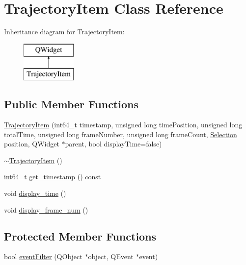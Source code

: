 \hypertarget{classTrajectoryItem}{}\section{Trajectory\+Item Class Reference}
\label{classTrajectoryItem}
Inheritance diagram for Trajectory\+Item\+:\begin{figure}[H]
\begin{center}
\leavevmode
\includegraphics[height=2.000000cm]{classTrajectoryItem}
\end{center}
\end{figure}
\subsection*{Public Member Functions}
\begin{DoxyCompactItemize}
\item 
\hyperlink{classTrajectoryItem_aec384c56b69d666cf6f02b7c4d3fc63a}{Trajectory\+Item} (int64\+\_\+t timestamp, unsigned long time\+Position, unsigned long total\+Time, unsigned long frame\+Number, unsigned long frame\+Count, \hyperlink{structSelection}{Selection} position, Q\+Widget $\ast$parent, bool display\+Time=false)
\item 
\hyperlink{classTrajectoryItem_a8affd9424072ada1f3058e5021c3b54f}{$\sim$\+Trajectory\+Item} ()
\item 
int64\+\_\+t \hyperlink{classTrajectoryItem_aa832c4a147087c2c5c33507f9bde20dd}{get\+\_\+timestamp} () const 
\item 
void \hyperlink{classTrajectoryItem_aac11cf95cd7d71fb567c7b7bbecea402}{display\+\_\+time} ()
\item 
void \hyperlink{classTrajectoryItem_a4f2b20acbd5e0f017ffbfc92d81d526a}{display\+\_\+frame\+\_\+num} ()
\end{DoxyCompactItemize}
\subsection*{Protected Member Functions}
\begin{DoxyCompactItemize}
\item 
bool \hyperlink{classTrajectoryItem_ade2ba7e092a0790fe29517071f257f35}{event\+Filter} (Q\+Object $\ast$object, Q\+Event $\ast$event)
\end{DoxyCompactItemize}


